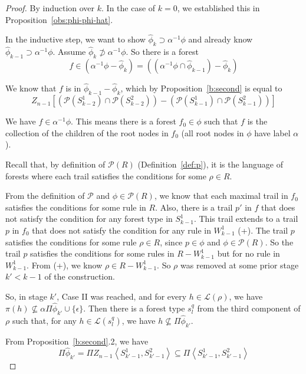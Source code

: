 \documentclass[sigplan,9pt]{acmart}\settopmatter{printfolios=true,printccs=false,printacmref=false}
\theoremstyle{definition}
\newcommand{\La}[0]{{\mathcal{L}}}
\newcommand{\Pa}[0]{{\mathcal{P}}}
\newcommand{\Rnm}[0]{Z_{n-1}}
\begin{document}
\begin{proof} By induction over $k$. In the case of $k=0$, we established this in Proposition~\ref{obs:phi-phi-hat}.

In the inductive step, we want to show $\widehat{\phi}_k \supset \alpha^{-1} \phi$ and already know $\widehat{\phi}_{k-1} \supset \alpha^{-1} \phi$.
Assume $\widehat{\phi}_k \not\supset \alpha^{-1} \phi$.
So there is a forest
\begin{equation}
f \in \left(\alpha^{-1} \phi  - \widehat{\phi}_k\right) = \left((\alpha^{-1} \phi \cap \widehat{\phi}_{k-1}) - \widehat{\phi}_k\right)
\end{equation}

We know that $f$ is in $\widehat{\phi}_{k-1} - \widehat{\phi}_k$, which by Proposition~\ref{b:second} is equal to
$$Z_{n-1} \left[(\Pa(S^1_{k-2}) \cap \Pa(S^2_{k-2})) - (\Pa(S^1_{k-1}) \cap \Pa(S^2_{k-1})) \right]$$

We have $f \in \alpha^{-1} \phi$. This means there is a forest $f_0 \in \phi$ such that $f$ is the collection of the children of the root nodes in $f_0$ (all root nodes in $\phi$ have label $\alpha$).

Recall that, by definition of $\Pa(R)$ (Definition~\ref{def:p}), it is the language of forests where each trail satisfies the conditions for some $\rho \in R$.


From the definition of $\Pa$ and $\phi \in \Pa(R)$, we know that each maximal trail in $f_0$ satisfies the conditions for some rule in $R$.
Also, there is a trail $p'$ in $f$ that does not satisfy the condition for any forest type in $S^1_{k-1}$.
 This trail extends to a trail  $p$ in $f_0$ that does not satisfy the condition for any rule in $W^1_{k-1}$ (+).
The trail $p$ satisfies the conditions for some rule $\rho \in R$, since $p \in \phi$ and $\phi \in \Pa(R)$.
 So the trail $p$ satisfies the conditions for some rules in $R - W^1_{k-1}$ but for no rule in $W^1_{k-1}$.
From (+), we know $\rho \in R - W^1_{k-1}$.
So $\rho$ was removed at some prior stage $k' < k-1$ of the construction.

So, in stage $k'$, Case II was reached, and for every $h \in \La(\rho)$, we have $\pi(h) \not\subseteq \alpha\Pi\widehat{\phi}_{k'} \cup \{\epsilon\}$.
Then there is a forest type $s_l^q$ from the third component of $\rho$ such that, for any $h \in \La(s_l^q)$, we have $h \not\subseteq \Pi\widehat{\phi}_{k'}$.

From Proposition~\ref{b:second}.2, we have
\begin{equation}\label{eq:c-conc}
\Pi \widehat{\phi}_{{k'}} = \Pi \Rnm  \left\langle S^1_{{k'}-1}, S^2_{{k'}-1}\right\rangle \subseteq \Pi\left\langle S^1_{{k'}-1}, S^2_{{k'}-1}\right\rangle 
\end{equation}


\end{proof}
\end{document}
